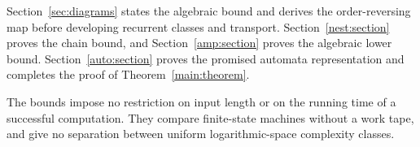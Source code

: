Section~\ref{sec:diagrams} states the algebraic bound and derives the
order-reversing map before developing recurrent classes and transport.
Section~\ref{nest:section} proves the chain bound, and
Section~\ref{amp:section} proves the algebraic lower bound.
Section~\ref{auto:section} proves the promised automata representation and
completes the proof of Theorem~\ref{main:theorem}.

The bounds impose no restriction on input length or on the running time
of a successful computation. They compare finite-state machines without
a work tape, and give no separation between uniform logarithmic-space
complexity classes.

